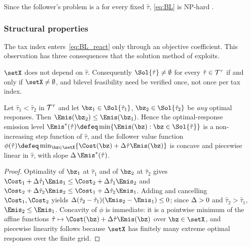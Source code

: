 Since the follower's problem is a \MILP for every fixed $\hat\tau$,
\eqref{eq:BL} is NP-hard \citep{moore1990,jeroslow1985}.

\subsubsection{Structural properties}
\label{sec:model:structure}

The tax index enters~\eqref{eq:BL_react} only through an objective
coefficient. This observation has three consequences that the solution
method of  exploits.

\begin{proposition}\label{prop:X_indep}
$\setX$ does not depend on $\hat{\tau}$. Consequently
$\Sol{\hat\tau}\neq\emptyset$ for every $\hat\tau\in\mathcal{T}^{\tau}$ if and
only if $\setX\neq\emptyset$, and bilevel feasibility need be verified
once, not once per tax index.
\end{proposition}

\begin{proposition}\label{prop:monotone}
Let $\hat\tau_1<\hat\tau_2$ in $\mathcal{T}^{\tau}$ and let
$\bz_1\in\Sol{\hat\tau_1}$, $\bz_2\in\Sol{\hat\tau_2}$ be \emph{any}
optimal responses. Then $\Emis(\bz_2)\le\Emis(\bz_1)$. Hence the
optimal-response emission level
$\Emis^{*}(\hat\tau)\defeq\min\{\Emis(\bz):\bz\in\Sol{\hat\tau}\}$ is a
non-increasing step function of $\hat\tau$, and the follower value
function
$\phi(\hat\tau)\defeq\min_{\bz\in\setX}\{\Cost(\bz)+\taxstep\hat\tau\Emis(\bz)\}$
is concave and piecewise linear in $\hat\tau$, with slope
$\taxstep\,\Emis^{*}(\hat\tau)$.
\end{proposition}

\begin{proof}
Optimality of $\bz_1$ at $\hat\tau_1$ and of $\bz_2$ at $\hat\tau_2$ gives
$\Cost_1+\taxstep\hat\tau_1\Emis_1\le\Cost_2+\taxstep\hat\tau_1\Emis_2$
and
$\Cost_2+\taxstep\hat\tau_2\Emis_2\le\Cost_1+\taxstep\hat\tau_2\Emis_1$.
Adding and cancelling $\Cost_1,\Cost_2$ yields
$\taxstep(\hat\tau_2-\hat\tau_1)(\Emis_2-\Emis_1)\le0$; since
$\Delta>0$ and $\hat\tau_2>\hat\tau_1$, $\Emis_2\le\Emis_1$.
Concavity of $\phi$ is immediate: it is a pointwise minimum of the
affine functions $\hat\tau\mapsto\Cost(\bz)+\taxstep\hat\tau\Emis(\bz)$
over $\bz\in\setX$, and piecewise linearity follows because $\setX$ has
finitely many extreme optimal responses over the finite grid.
\end{proof}

